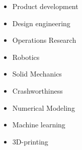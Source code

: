 \documentclass[
	a4paper,
]{ThirtyNinesecondscv}
\begin{document}
\begin{multicols}{3}
	\small
\begin{itemize}
 \item { Product development}
 \item Design engineering 
 \item Operations Research

\item Robotics

 \item Solid Mechanics
 \item Crashworthiness 
\item Numerical Modeling
 \item Machine learning

\item 3D-printing
\end{itemize}
\end{multicols}

\end{document}
